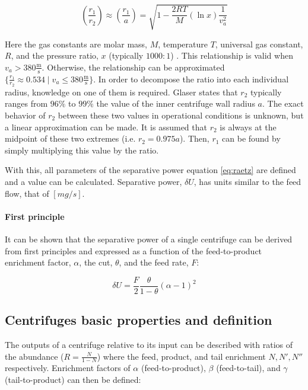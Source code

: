 \begin{equation}
    \left(\frac{r_1}{r_2}\right) \approx \left(\frac{r_1}{a}\right) = \sqrt{1 - \frac{2RT}{M}(\ln x)\frac{1}{v_{a}^{2}}}
\end{equation}
 
Here the gas constants are molar mass, $M$, temperature $T$, universal gas constant, $R$,
and the pressure ratio, $x$ (typically $1000:1$) \cite{}. %
This relationship is valid when $v_a > 380 \frac{\mathrm{m}}{\mathrm{s}}$.
Otherwise, the relationship can be approximated $\{\frac{r_1}{r_2} \approx 0.534 \mid v_a \leq 380 \frac{\mathrm{m}}{\mathrm{s}}\}$.
In order to decompose the ratio into each individual radius, knowledge on one
of them is required. Glaser \cite{glaser.2008} states that $r_2$ typically ranges
from $96\%$ to $99\%$ the value of the inner centrifuge wall radius $a$. The exact
behavior of $r_2$ between these two values in operational conditions is unknown,
but a linear approximation can be made. It is assumed that $r_2$ is always at
the midpoint of these two extremes (i.e. $r_2 = 0.975 a$). Then, $r_1$ can be
found by simply multiplying this value by the ratio.

With this, all parameters of the separative power equation \ref{eq:raetz} are
defined and a value can be calculated. Separative power, $\delta U$, has units similar to the feed flow, that of $[mg/s]$.

\paragraph{First principle}

It can be shown \cite{avery} that the separative power of a single centrifuge can be
derived from first principles and expressed as a function of the feed-to-product enrichment factor, $\alpha$, the cut, $\theta$, and the feed rate, $F$:

\begin{equation} \label{eq_alpha_principle}
    \delta U = \frac{F}{2}\frac{\theta}{1-\theta}(\alpha-1)^{2}
\end{equation}

\subsection{Centrifuges basic properties and definition}

The outputs of a centrifuge relative to its input can be described with ratios
of the abundance ($R = \frac{N}{1-N}$) where the feed, product, and tail enrichment $N, N', N''$ respectively. Enrichment factors of $\alpha$ (feed-to-product),
$\beta$ (feed-to-tail), and $\gamma$ (tail-to-product) can then be defined:

